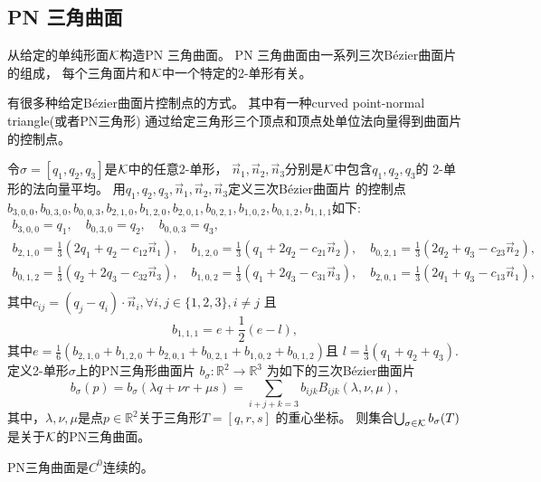 \subsection{PN 三角曲面}
\label{sec:PNTriangle}

\begin{rem}
  从给定的单纯形面${\cal K}$构造PN 三角曲面。
  PN 三角曲面由一系列三次Bézier曲面片的组成，
  每个三角面片和${\cal K}$中一个特定的2-单形有关。
\end{rem}

\begin{rem}
  有很多种给定Bézier曲面片控制点的方式。
  其中有一种curved point-normal triangle(或者PN三角形)
  通过给定三角形三个顶点和顶点处单位法向量得到曲面片的控制点。
\end{rem}

\begin{defn}
  令$\sigma=[q_1,q_2,q_3]$是${\cal K}$中的任意2-单形，
  $\vec{n}_1,\vec{n}_2,\vec{n}_3$分别是${\cal K}$中包含$q_1,q_2,q_3$的
  2-单形的法向量平均。
  用$q_1,q_2,q_3,\vec{n}_1,\vec{n}_2,\vec{n}_3$定义三次Bézier曲面片
  的控制点
  $b_{3,0,0},b_{0,3,0},b_{0,0,3},b_{2,1,0},b_{1,2,0},b_{2,0,1},
  b_{0,2,1},b_{1,0,2},b_{0,1,2},b_{1,1,1}$如下:
  \begin{gather*}
        b_{3,0,0}=q_1,\quad b_{0,3,0}= q_2, \quad b_{0,0,3}=q_3,\\
        b_{2,1,0}=\frac{1}{3}(2q_1+q_2-c_{12}\vec{n}_1),\quad
        b_{1,2,0}=\frac{1}{3}(q_1+2q_2-c_{21}\vec{n}_2),\quad
        b_{0,2,1}=\frac{1}{3}(2q_2+q_3-c_{23}\vec{n}_2),\\
        b_{0,1,2}=\frac{1}{3}(q_2+2q_3-c_{32}\vec{n}_3),\quad
        b_{1,0,2}=\frac{1}{3}(q_1+2q_3-c_{31}\vec{n}_3),\quad
        b_{2,0,1}=\frac{1}{3}(2q_1+q_3-c_{13}\vec{n}_1),\\
      \end{gather*}
      其中$c_{ij}=(q_j-q_i)\cdot \vec{n}_i,\forall
      i,j\in\{1,2,3\},i\neq j$
      且
      \begin{displaymath}
        b_{1,1,1}=e+\frac{1}{2}(e-l),
      \end{displaymath}
      其中$e=\frac{1}{6}(b_{2,1,0}+b_{1,2,0}+b_{2,0,1}
      +b_{0,2,1}+b_{1,0,2}+b_{0,1,2})$且
      $l=\frac{1}{3}(q_1+q_2+q_3)$.
      定义2-单形$\sigma$上的PN三角形曲面片
      $b_\sigma:\mathbb{R}^2\rightarrow\mathbb{R}^3$
      为如下的三次Bézier曲面片
      \begin{equation}
        b_\sigma(p)=b_\sigma(\lambda q+\nu r+\mu s)=
        \sum_{i+j+k=3}b_{ijk}B_{ijk}(\lambda,\nu,\mu),
      \end{equation}
      其中，$\lambda,\nu,\mu$是点$p\in\mathbb{R}^2$关于三角形$T=[q,r,s]$
      的重心坐标。
      则集合$\bigcup_{\sigma\in {\cal K}}b_\sigma(T)$
      是关于${\cal K}$的PN三角曲面。
\end{defn}

\begin{rem}
  PN三角曲面是$C^0$连续的。
\end{rem}

